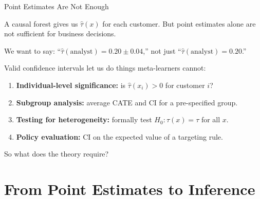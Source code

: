 \documentclass[aspectratio=169, 11pt, handout]{beamer}
\begin{document}
\begin{frame}{Point Estimates Are Not Enough}
 
A causal forest gives us $\hat{\tau}(x)$ for each customer. But point estimates alone are not sufficient for business decisions.
 
\pause
\bigskip
 
We want to say: ``$\hat{\tau}(\text{analyst}) = 0.20 \pm 0.04$,'' not just ``$\hat{\tau}(\text{analyst}) = 0.20$.''
 
\pause
\bigskip
 
Valid confidence intervals let us do things meta-learners cannot:
 
\begin{enumerate}
    \item \textbf{Individual-level significance:} is $\hat{\tau}(x_i) > 0$ for customer $i$?
    \pause
    \item \textbf{Subgroup analysis:} average CATE and CI for a pre-specified group.
    \pause
    \item \textbf{Testing for heterogeneity:} formally test $H_0: \tau(x) = \tau$ for all $x$.
    \pause
    \item \textbf{Policy evaluation:} CI on the expected value of a targeting rule.
\end{enumerate}
 
\pause
\bigskip
 
So what does the theory require?
 
\end{frame}
 
 
\section{From Point Estimates to Inference}
 
\end{document}
